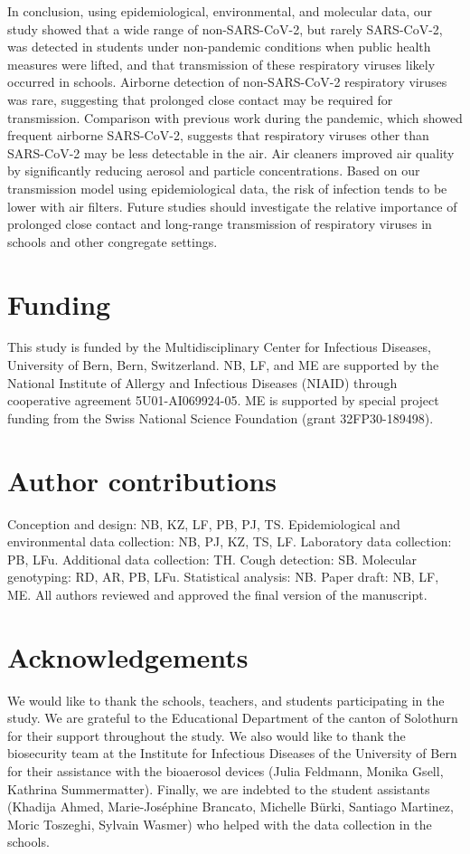\documentclass[fleqn,11pt]{wlscirep}
\begin{document}
In conclusion, using epidemiological, environmental, and molecular data, our study showed that a wide range of non-SARS-CoV-2, but rarely SARS-CoV-2, was detected in students under non-pandemic conditions when public health measures were lifted, and that transmission of these respiratory viruses likely occurred in schools. Airborne detection of non-SARS-CoV-2 respiratory viruses was rare, suggesting that prolonged close contact may be required for transmission. Comparison with previous work during the pandemic, which showed frequent airborne SARS-CoV-2, suggests that respiratory viruses other than SARS-CoV-2 may be less detectable in the air. Air cleaners improved air quality by significantly reducing aerosol and particle concentrations. Based on our transmission model using epidemiological data, the risk of infection tends to be lower with air filters. Future studies should investigate the relative importance of prolonged close contact and long-range transmission of respiratory viruses in schools and other congregate settings.

\newpage


\section*{Funding}
This study is funded by the Multidisciplinary Center for Infectious Diseases, University of Bern, Bern, Switzerland. NB, LF, and ME are supported by the National Institute of Allergy and Infectious Diseases (NIAID) through cooperative agreement 5U01-AI069924-05. ME is supported by special project funding from the Swiss National Science Foundation (grant 32FP30-189498). \medskip

\section*{Author contributions}
Conception and design: NB, KZ, LF, PB, PJ, TS. Epidemiological and environmental data collection: NB, PJ, KZ, TS, LF. Laboratory data collection: PB, LFu. Additional data collection: TH. Cough detection: SB. Molecular genotyping: RD, AR, PB, LFu. Statistical analysis: NB. Paper draft: NB, LF, ME. All authors reviewed and approved the final version of the manuscript.


\section*{Acknowledgements}
We would like to thank the schools, teachers, and students participating in the study. We are grateful to the Educational Department of the canton of Solothurn for their support throughout the study. We also would like to thank the biosecurity team at the Institute for Infectious Diseases of the University of Bern for their assistance with the bioaerosol devices (Julia Feldmann, Monika Gsell, Kathrina Summermatter). Finally, we are indebted to the student assistants (Khadija Ahmed, Marie-Joséphine Brancato, Michelle Bürki, Santiago Martinez, Moric Toszeghi, Sylvain Wasmer) who helped with the data collection in the schools.


\end{document}
